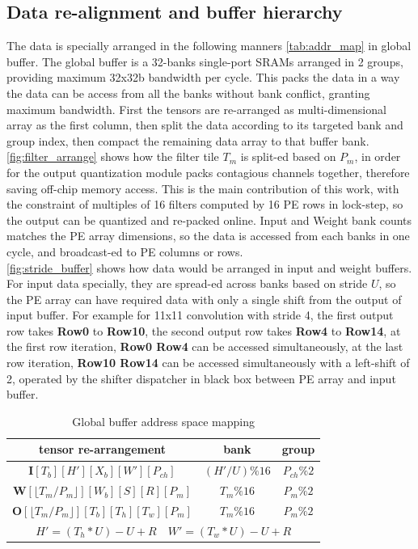 \subsection{Data re-alignment and buffer hierarchy}
The data is specially arranged in the following manners \autoref{tab:addr_map} in global buffer. The global buffer is a 32-banks single-port SRAMs arranged in 2 groups, providing maximum 32x32b bandwidth per cycle.  This packs the data in a way the data can be access from all the banks without bank conflict, granting maximum bandwidth. First the tensors are re-arranged as multi-dimensional array as the first column, then split the data according to its targeted bank and group index, then compact the remaining data array to that buffer bank. \\
\autoref{fig:filter_arrange} shows how the filter tile $T_m$ is split-ed based on $P_m$, in order for the output quantization module packs contagious channels together, therefore saving off-chip memory access. This is the main contribution of this work, with the constraint of multiples of 16 filters computed by 16 PE rows in lock-step, so the output can be quantized and re-packed online. Input and Weight bank counts matches the PE array dimensions, so the data is accessed from each banks in one cycle, and broadcast-ed to PE columns or rows. \\
\autoref{fig:stride_buffer} shows how data would be arranged in input and weight buffers. For input data specially, they are spread-ed across banks based on stride $U$, so the PE array can have required data with only a single shift from the output of input buffer. For example for 11x11 convolution with stride 4, the first output row takes \textbf{Row0} to \textbf{Row10}, the second output row takes \textbf{Row4} to  \textbf{Row14}, at the first row iteration, \textbf{Row0 Row4} can be accessed simultaneously, at the last row iteration, \textbf{Row10 Row14} can be accessed simultaneously with a left-shift of 2, operated by the shifter dispatcher in black box between PE array and input buffer. \\
\begin{table}[h]
    \caption{Global buffer address space mapping}
    \label{tab:addr_map}
    \centering
    \footnotesize 
        \begin{tabular}{ccc}
        \toprule
        tensor re-arrangement  & bank & group \\
        \midrule
            $\boldsymbol{I}[T_b][H'][X_b][W'][P_{ch}]$   &$(H'/U)\%16$ & $P_{ch}\%2$\\
            $\boldsymbol{W}[\lfloor T_m/P_m \rfloor][W_b][S][R][P_m]$ & $T_m\%16$ & $P_m\%2$\\
            $\boldsymbol{O}[\lfloor T_m/P_m \rfloor][T_b][T_h][T_w][P_m]$ & $T_m\%16$ & $P_m\%2$\\

        \bottomrule
        \multicolumn{3}{c}{$H'=(T_h*U)-U+R\quad W'=(T_w*U)-U+R$} 
        \end{tabular}
\end{table}

